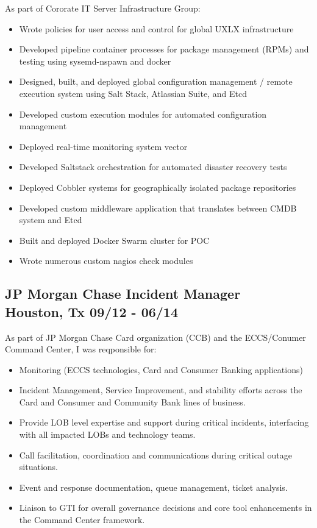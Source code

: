 \documentclass{article}
\begin{document}
  As part of Cororate IT Server Infrastructure Group:\\
  \begin{itemize}
  \item Wrote policies for user access and control for global UXLX infrastructure
  \item Developed pipeline container processes for package management (RPMs) and testing using sysemd-nspawn and docker
  \item Designed, built, and deployed global configuration management / remote execution system using Salt Stack, Atlassian Suite, and Etcd
  \item Developed custom execution modules for automated configuration management
  \item Deployed real-time monitoring system vector
  \item Developed Saltstack orchestration for automated disaster recovery tests
  \item Deployed Cobbler systems for geographically isolated package repositories
  \item Developed custom middleware application that translates between CMDB system and Etcd
  \item Built and deployed Docker Swarm cluster for POC
  \item Wrote numerous custom nagios check modules
  \end{itemize}

  \subsection{JP Morgan Chase \hfill Incident Manager\\
    Houston, Tx \hfill 09/12 - 06/14
  }

  As part of JP Morgan Chase Card organization (CCB) and the ECCS/Conumer Command Center, I was reqponsible for:\\
  \begin{itemize}
  \item Monitoring (ECCS technologies, Card and Consumer Banking applications)
  \item Incident Management, Service Improvement, and stability efforts across the Card and Consumer and Community Bank lines of business.
  \item Provide LOB level expertise and support during critical incidents, interfacing with all impacted LOBs and technology teams.
  \item Call facilitation, coordination and communications during critical outage situations.
  \item Event and response documentation, queue management, ticket analysis.
  \item Liaison to GTI for overall governance decisions and core tool enhancements in the Command Center framework.
  \end{itemize}
\end{document}
